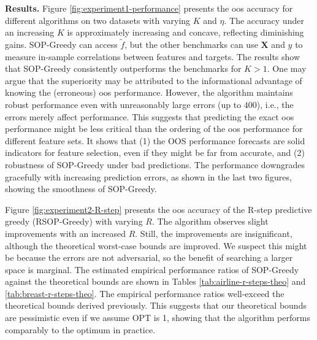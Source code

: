 \textbf{Results.} Figure \ref{fig:experiment1-performance} presents the oos accuracy for different algorithms on two datasets with varying $K$ and $\eta$. The accuracy under an increasing $K$ is approximately increasing and concave, reflecting diminishing gains. 
SOP-Greedy can access $\tilde{f}$, but the other benchmarks can use $\boldsymbol{X}$ and $y$ to measure in-sample correlations between features and targets. The results show that SOP-Greedy consistently outperforms the benchmarks for $K > 1$. One may argue that the superiority may be attributed to the informational advantage of knowing the (erroneous) oos performance. However, the algorithm maintains robust performance even with unreasonably large errors (up to $400$), i.e., the errors merely affect performance. This suggests that predicting the exact oos performance might be less critical than the ordering of the oos performance for different feature sets. It shows that (1) the OOS performance forecasts are solid indicators for feature selection, even if they might be far from accurate, and (2) robustness of SOP-Greedy under bad predictions. The performance downgrades gracefully with increasing prediction errors, as shown in the last two figures, showing the smoothness of SOP-Greedy. 


Figure \ref{fig:experiment2-R-step} presents the oos accuracy of the R-step predictive greedy (RSOP-Greedy) with varying $R$. The algorithm observes slight improvements with an increased $R$. Still, the improvements are insignificant, although the theoretical worst-case bounds are improved. We suspect this might be because the errors are not adversarial, so the benefit of searching a larger space is marginal. The estimated empirical performance ratios of SOP-Greedy against the theoretical bounds are shown in Tables \ref{tab:airline-r-steps-theo} and \ref{tab:breast-r-steps-theo}. The empirical performance ratios well-exceed the theoretical bounds derived previously. This suggests that our theoretical bounds are pessimistic even if we assume OPT is 1, showing that the algorithm performs comparably to the optimum in practice. 






